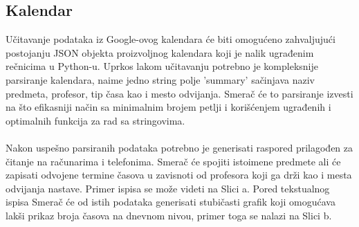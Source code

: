 \documentclass[a4paper,11pt]{article}
\begin{document}
\subsection{Kalendar}
Učitavanje podataka iz Google-ovog kalendara će biti omogućeno zahvaljujući postojanju JSON objekta proizvoljnog kalendara koji je nalik ugrađenim rečnicima u Python-u. Uprkos lakom učitavanju potrebno je kompleksnije parsiranje kalendara, naime jedno string polje 'summary' sačinjava naziv predmeta, profesor, tip časa kao i mesto odvijanja. Smerač će to parsiranje izvesti na što efikasniji način sa minimalnim brojem petlji i korišćenjem ugrađenih i optimalnih funkcija za rad sa stringovima.
\\\\
Nakon uspešno parsiranih podataka potrebno je generisati raspored prilagođen za čitanje na računarima i telefonima. Smerač će spojiti istoimene predmete ali će zapisati odvojene termine časova u zavisnoti od profesora koji ga drži kao i mesta odvijanja nastave. Primer ispisa se može videti na Slici a. Pored tekstualnog ispisa Smerač će od istih podataka generisati stubičasti grafik koji omogućava lakši prikaz broja časova na dnevnom nivou, primer toga se nalazi na Slici b.
\begin{figure}[h]
    \centering
    \hspace{1cm}
\end{figure}
\newpage
\end{document}
